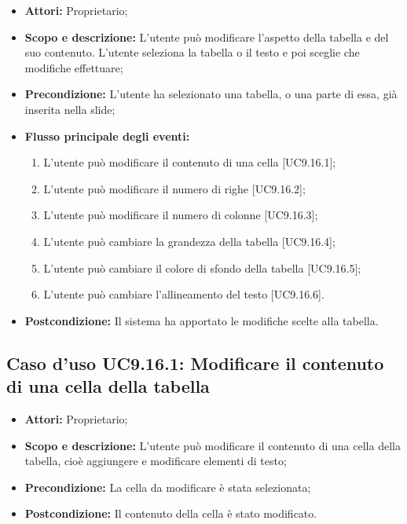 \begin{itemize}
	\item \textbf{Attori:} Proprietario;
	\item \textbf{Scopo e descrizione:} L'utente può modificare l'aspetto della tabella e del suo contenuto. L'utente seleziona la tabella o il testo e poi sceglie che modifiche effettuare;
	\item \textbf{Precondizione:} L'utente ha selezionato una tabella, o una parte di essa, già inserita nella \gls{slide};
	\item \textbf{Flusso principale degli eventi:}
	\begin{enumerate}
		\item L'utente può modificare il contenuto di una cella [UC9.16.1];
		\item L'utente può modificare il numero di righe [UC9.16.2];
		\item L'utente può modificare il numero di colonne [UC9.16.3];
		\item L'utente può cambiare la grandezza della tabella [UC9.16.4];
		\item L'utente può cambiare il colore di sfondo della tabella [UC9.16.5];
		\item L'utente può cambiare l'allineamento del testo [UC9.16.6].
	\end{enumerate}
	\item \textbf{Postcondizione:} Il sistema ha apportato le modifiche scelte alla tabella.
\end{itemize}

	\subsection{Caso d'uso UC9.16.1: Modificare il contenuto di una cella della tabella}
	\begin{itemize}
		\item \textbf{Attori:} Proprietario;
		\item \textbf{Scopo e descrizione:} L'utente può modificare il contenuto di una cella della tabella, cioè aggiungere e modificare elementi di testo;
		\item \textbf{Precondizione:} La cella da modificare è stata selezionata;
		\item \textbf{Postcondizione:} Il contenuto della cella è stato modificato.
	\end{itemize}
	

